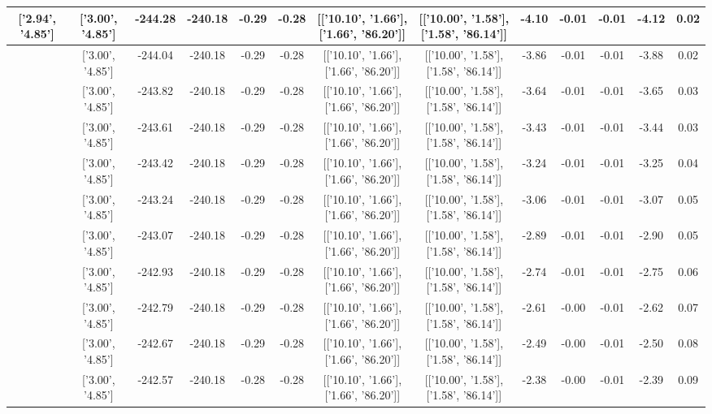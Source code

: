 \begin{table}[htbp]
\begin{adjustbox}{angle=90}
\begin{tabular}{|c|c|c|c|c|c|c|c|c|c|c|c|c|}
 ['2.94', '4.85'] & ['3.00', '4.85'] & -244.28 & -240.18 & -0.29 & -0.28 & [['10.10', '1.66'], ['1.66', '86.20']] & [['10.00', '1.58'], ['1.58', '86.14']] & -4.10 & -0.01 & -0.01 & -4.12 & 0.02\\ \hline
 ['2.94', '4.85'] & ['3.00', '4.85'] & -244.04 & -240.18 & -0.29 & -0.28 & [['10.10', '1.66'], ['1.66', '86.20']] & [['10.00', '1.58'], ['1.58', '86.14']] & -3.86 & -0.01 & -0.01 & -3.88 & 0.02\\ \hline
 ['2.94', '4.85'] & ['3.00', '4.85'] & -243.82 & -240.18 & -0.29 & -0.28 & [['10.10', '1.66'], ['1.66', '86.20']] & [['10.00', '1.58'], ['1.58', '86.14']] & -3.64 & -0.01 & -0.01 & -3.65 & 0.03\\ \hline
 ['2.95', '4.85'] & ['3.00', '4.85'] & -243.61 & -240.18 & -0.29 & -0.28 & [['10.10', '1.66'], ['1.66', '86.20']] & [['10.00', '1.58'], ['1.58', '86.14']] & -3.43 & -0.01 & -0.01 & -3.44 & 0.03\\ \hline
 ['2.95', '4.85'] & ['3.00', '4.85'] & -243.42 & -240.18 & -0.29 & -0.28 & [['10.10', '1.66'], ['1.66', '86.20']] & [['10.00', '1.58'], ['1.58', '86.14']] & -3.24 & -0.01 & -0.01 & -3.25 & 0.04\\ \hline
 ['2.96', '4.85'] & ['3.00', '4.85'] & -243.24 & -240.18 & -0.29 & -0.28 & [['10.10', '1.66'], ['1.66', '86.20']] & [['10.00', '1.58'], ['1.58', '86.14']] & -3.06 & -0.01 & -0.01 & -3.07 & 0.05\\ \hline
 ['2.96', '4.85'] & ['3.00', '4.85'] & -243.07 & -240.18 & -0.29 & -0.28 & [['10.10', '1.66'], ['1.66', '86.20']] & [['10.00', '1.58'], ['1.58', '86.14']] & -2.89 & -0.01 & -0.01 & -2.90 & 0.05\\ \hline
 ['2.96', '4.85'] & ['3.00', '4.85'] & -242.93 & -240.18 & -0.29 & -0.28 & [['10.10', '1.66'], ['1.66', '86.20']] & [['10.00', '1.58'], ['1.58', '86.14']] & -2.74 & -0.01 & -0.01 & -2.75 & 0.06\\ \hline
 ['2.97', '4.85'] & ['3.00', '4.85'] & -242.79 & -240.18 & -0.29 & -0.28 & [['10.10', '1.66'], ['1.66', '86.20']] & [['10.00', '1.58'], ['1.58', '86.14']] & -2.61 & -0.00 & -0.01 & -2.62 & 0.07\\ \hline
 ['2.97', '4.85'] & ['3.00', '4.85'] & -242.67 & -240.18 & -0.29 & -0.28 & [['10.10', '1.66'], ['1.66', '86.20']] & [['10.00', '1.58'], ['1.58', '86.14']] & -2.49 & -0.00 & -0.01 & -2.50 & 0.08\\ \hline
 ['2.97', '4.85'] & ['3.00', '4.85'] & -242.57 & -240.18 & -0.28 & -0.28 & [['10.10', '1.66'], ['1.66', '86.20']] & [['10.00', '1.58'], ['1.58', '86.14']] & -2.38 & -0.00 & -0.01 & -2.39 & 0.09\\ \hline

\end{tabular}
\end{adjustbox}
\end{table}
